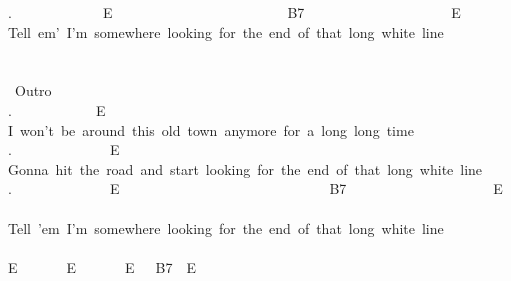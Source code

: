 {.\ \ \ \ \ \ \ \ \ \ \ \ \ E\ \ \ \ \ \ \ \ \ \ \ \ \ \ \ \ \ \ \ \ \ \ \ \ \ B7\ \ \ \ \ \ \ \ \ \ \ \ \ \ \ \ \ \ \ \ \ E\ \\
Tell\ em'\ I'm\ somewhere\ looking\ for\ the\ end\ of\ that\ long\ white\ line\\
\\
\\
\lbrack\ Outro\rbrack\\
.\ \ \ \ \ \ \ \ \ \ \ \ E\ \\
I\ won't\ be\ around\ this\ old\ town\ anymore\ for\ a\ long\ long\ time\\
.\ \ \ \ \ \ \ \ \ \ \ \ \ \ E\\
Gonna\ hit\ the\ road\ and\ start\ looking\ for\ the\ end\ of\ that\ long\ white\ line\\
.\ \ \ \ \ \ \ \ \ \ \ \ \ \ E\ \ \ \ \ \ \ \ \ \ \ \ \ \ \ \ \ \ \ \ \ \ \ \ \ \ \ \ \ \ B7\ \ \ \ \ \ \ \ \ \ \ \ \ \ \ \ \ \ \ \ \ E\ \ \ \ \ \ \\
Tell\ 'em\ I'm\ somewhere\ looking\ for\ the\ end\ of\ that\ long\ white\ line\ \\
\\
E\ \ \ \ \ \ \ E\ \ \ \ \ \ \ E\ \ \ B7\ \ E}
